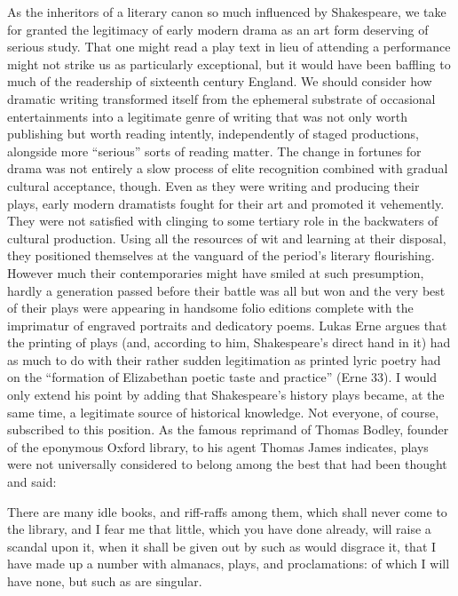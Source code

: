 As the inheritors of a literary canon so much influenced by Shakespeare, we take for granted the legitimacy of early modern drama as an art form deserving of serious study. That one might read a play text in lieu of attending a performance might not strike us as particularly exceptional, but it would have been baffling to much of the readership of sixteenth century England. We should consider how dramatic writing transformed itself from the ephemeral substrate of occasional entertainments into a legitimate genre of writing that was not only worth publishing but worth reading intently, independently of staged productions, alongside more ``serious'' sorts of reading matter. The change in fortunes for drama was not entirely a slow process of elite recognition combined with gradual cultural acceptance, though. Even as they were writing and producing their plays, early modern dramatists fought for their art and promoted it vehemently. They were not satisfied with clinging to some tertiary role in the backwaters of cultural production. Using all the resources of wit and learning at their disposal, they positioned themselves at the vanguard of the period's literary flourishing. However much their contemporaries might have smiled at such presumption, hardly a generation passed before their battle was all but won and the very best of their plays were appearing in handsome folio editions complete with the imprimatur of engraved portraits and dedicatory poems. Lukas Erne argues that the printing of plays (and, according to him, Shakespeare's direct hand in it) had as much to do with their rather sudden legitimation as printed lyric poetry had on the ``formation of Elizabethan poetic taste and practice'' (Erne 33). I would only extend his point by adding that Shakespeare's history plays became, at the same time, a legitimate source of historical knowledge. Not everyone, of course, subscribed to this position. As the famous reprimand of Thomas Bodley, founder of the eponymous Oxford library, to his agent Thomas James indicates, plays were not universally considered to belong among the best that had been thought and said:
\begin{bq}
There are many idle books, and riff-raffs among them, which shall never come to the library, and I fear me that little, which you have done already, will raise a scandal upon it, when it shall be given out by such as would disgrace it, that I have made up a number with almanacs, plays, and proclamations: of which I will have none, but such as are singular.~\cite[219--222]{bodley_letters_1926}
\end{bq}


